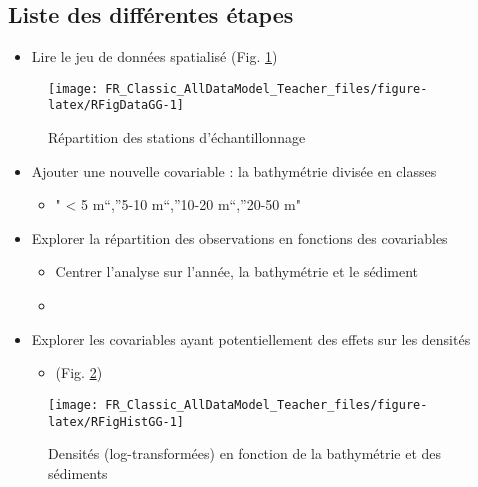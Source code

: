 \documentclass[french,a4paper]{article}
\providecommand{\tightlist}{%
  \setlength{\itemsep}{0pt}\setlength{\parskip}{0pt}}
\begin{document}
\hypertarget{liste-des-differentes-etapes}{%
\subsection{Liste des différentes étapes}\label{liste-des-differentes-etapes}}

\begin{itemize}
\tightlist
\item
  Lire le jeu de données spatialisé (Fig. \ref{fig:RFigDataGG})
\end{itemize}



\begin{figure}[!h]

{\centering \texttt{[image: FR\_Classic\_AllDataModel\_Teacher\_files/figure-latex/RFigDataGG-1]} 

}

\caption{Répartition des stations d'échantillonnage}\label{fig:RFigDataGG}
\end{figure}

\begin{itemize}
\tightlist
\item
  Ajouter une nouvelle covariable : la bathymétrie divisée en classes

  \begin{itemize}
  \tightlist
  \item
    " \textless{} 5 m``,''5-10 m``,''10-20 m``,''20-50 m"
  \end{itemize}
\item
  Explorer la répartition des observations en fonctions des covariables

  \begin{itemize}
  \item
    Centrer l'analyse sur l'année, la bathymétrie et le sédiment
  \item
  \end{itemize}
\item
  Explorer les covariables ayant potentiellement des effets sur les densités

  \begin{itemize}
  \tightlist
  \item
    (Fig. \ref{fig:RFigHistGG})
  \end{itemize}
\end{itemize}



\begin{figure}[!h]

{\centering \texttt{[image: FR\_Classic\_AllDataModel\_Teacher\_files/figure-latex/RFigHistGG-1]} 

}

\caption{Densités (log-transformées) en fonction de la bathymétrie et des sédiments}\label{fig:RFigHistGG}
\end{figure}
\end{document}
